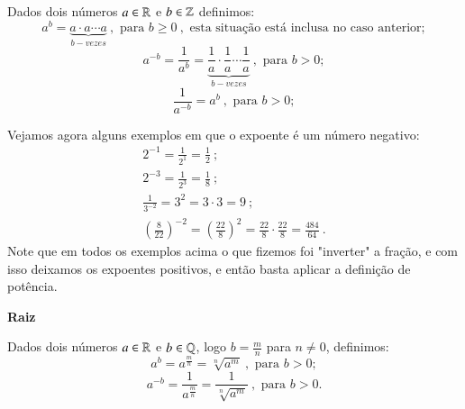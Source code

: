  
 \vskip0.3cm
 
 \colorbox{azul}{
 \begin{minipage}{14.5cm}
 \begin{center}
   Dados dois números $a \in \mathbb{R}$ e $b \in \mathbb{Z}$ definimos:
 \[a^b= \underbrace{a \cdot a \cdots a}_{b - vezes} \ , \text{ para } b\geq0 \ , \text{ esta situação está inclusa no caso anterior};\]
 \[a^{-b}= \frac{1}{a^b}= \underbrace{\frac{1}{a} \cdot \frac{1}{a} \cdots \frac{1}{a}}_{b - vezes} \ , \text{ para } b>0 ;\]
 \[\frac{1}{a^{-b}}= a^b \ , \text{ para } b>0;\]
 \end{center}
 \end{minipage}}
 
 \vskip0.3cm
 
 \begin{exem}
 Vejamos agora alguns exemplos em que o expoente é um número negativo:
 \begin{eqnarray*}
  2^{-1}= \frac{1}{2^{1}}= \frac{1}{2} \ ; \\
  2^{-3}= \frac{1}{2^3}= \frac{1}{8} \ ; \\
  \frac{1}{3^{-2}}= 3^2= 3 \cdot 3= 9 \ ; \\
  \left( \frac{8}{22} \right)^{-2}= \left( \frac{22}{8} \right)^{2}= \frac{22}{8} \cdot \frac{22}{8}= \frac{484}{64} \ .
 \end{eqnarray*}
 Note que em todos os exemplos acima o que fizemos foi "inverter" a fração, e com isso deixamos os expoentes positivos, e então basta aplicar a definição de potência.

 \end{exem}
 
 \vskip0.3cm

 \textbf{Raiz}
 
 \vskip0.3cm
 
 \colorbox{azul}{
 \begin{minipage}{14.5cm}
 \begin{center}
  Dados dois números $a \in \mathbb{R}$ e $b \in \mathbb{Q}$, logo $b= \frac{m}{n}$ para $n \neq 0$, definimos:
 \[a^b= a^{\frac{m}{n}}= \sqrt[n]{a^m} \ , \text{ para } b>0 ;\]
 \[a^{-b}= \frac{1}{a^{\frac{m}{n}}}= \frac{1}{\sqrt[n]{a^m}} \ ,  \text{ para } b>0.\]
 \end{center}
 \end{minipage}}
 
 \vskip0.3cm
 

